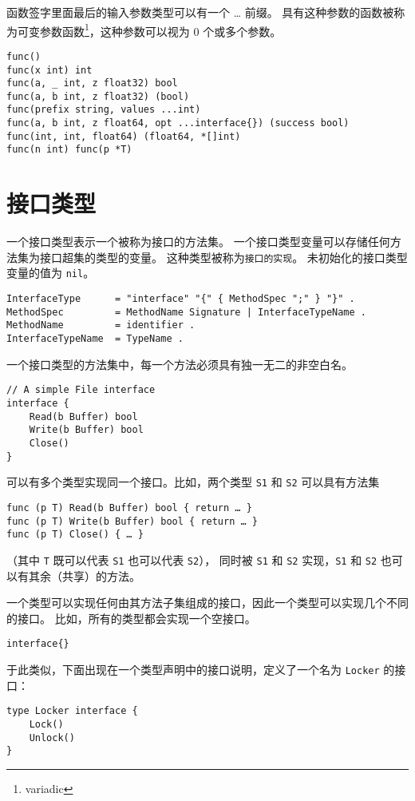 函数签字里面最后的输入参数类型可以有一个 \dots{} 前缀。
具有这种参数的函数被称为可变参数函数\footnote{variadic}，这种参数可以视为 0 个或多个参数。
\begin{lstlisting}[style=golang]
func()
func(x int) int
func(a, _ int, z float32) bool
func(a, b int, z float32) (bool)
func(prefix string, values ...int)
func(a, b int, z float64, opt ...interface{}) (success bool)
func(int, int, float64) (float64, *[]int)
func(n int) func(p *T)
\end{lstlisting}


\section{接口类型}
一个接口类型表示一个被称为接口的方法集。
一个接口类型变量可以存储任何方法集为接口超集的类型的变量。
这种类型被称为\lstinline|接口的实现|。
未初始化的接口类型变量的值为 \lstinline|nil|。
\begin{lstlisting}[style=EBNF]
InterfaceType      = "interface" "{" { MethodSpec ";" } "}" .
MethodSpec         = MethodName Signature | InterfaceTypeName .
MethodName         = identifier .
InterfaceTypeName  = TypeName .
\end{lstlisting}

一个接口类型的方法集中，每一个方法必须具有独一无二的非空白名。
\begin{lstlisting}[style=golang]
// A simple File interface
interface {
	Read(b Buffer) bool
	Write(b Buffer) bool
	Close()
}
\end{lstlisting}

可以有多个类型实现同一个接口。比如，两个类型 \lstinline|S1| 和 \lstinline|S2| 可以具有方法集
\begin{lstlisting}[style=golang]
func (p T) Read(b Buffer) bool { return … }
func (p T) Write(b Buffer) bool { return … }
func (p T) Close() { … }
\end{lstlisting}

（其中 \lstinline|T| 既可以代表 \lstinline|S1| 也可以代表 \lstinline|S2|），
同时被 \lstinline|S1| 和 \lstinline|S2| 实现，\lstinline|S1| 和 \lstinline|S2| 也可以有其余（共享）的方法。

一个类型可以实现任何由其方法子集组成的接口，因此一个类型可以实现几个不同的接口。
比如，所有的类型都会实现一个空接口。
\begin{lstlisting}[style=golang]
interface{}
\end{lstlisting}

于此类似，下面出现在一个类型声明中的接口说明，定义了一个名为 \lstinline|Locker| 的接口：
\begin{lstlisting}[style=golang]
type Locker interface {
	Lock()
	Unlock()
}
\end{lstlisting}

